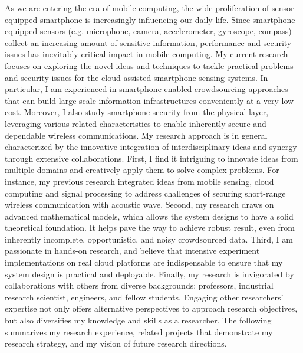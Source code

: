 \documentclass[11pt]{article}
\begin{document}








As we are entering the era of mobile computing, the wide proliferation of sensor-equipped smartphone is increasingly influencing our daily life. Since smartphone equipped sensors (e.g. microphone, camera, accelerometer, gyroscope, compass) collect an increasing amount of sensitive information, performance and security issues has inevitably critical impact in mobile computing. My current research focuses on exploring the novel ideas and techniques to tackle practical problems and security issues for the cloud-assisted smartphone sensing systems. In particular, I am experienced in smartphone-enabled crowdsourcing approaches that can build large-scale information infrastructures conveniently at a very low cost. Moreover, I also study smartphone security from the physical layer, leveraging various related characteristics to enable inherently secure and dependable wireless communications. My research approach is in general characterized by the innovative integration of interdisciplinary ideas and synergy through extensive collaborations. First, I find it intriguing to innovate ideas from multiple domains and creatively apply them to solve complex problems. For instance, my previous research integrated ideas from mobile sensing, cloud computing and signal processing to address challenges of securing short-range wireless communication with acoustic wave. Second, my research draws on advanced mathematical models, which allows the system designs to have a solid theoretical foundation. It helps pave the way to achieve robust result, even from inherently incomplete, opportunistic, and noisy crowdsourced data. Third, I am passionate in hands-on research, and believe that intensive experiment implementations on real cloud platforms are indispensable to ensure that my system design is practical and deployable. Finally, my research is invigorated by collaborations with others from diverse backgrounds: professors, industrial research scientist, engineers, and fellow students. Engaging other researchers' expertise not only offers alternative perspectives to approach research objectives, but also diversifies my knowledge and skills as a researcher. The following summarizes my research experience, related projects that demonstrate my research strategy, and my vision of future research directions.
\end{document}
